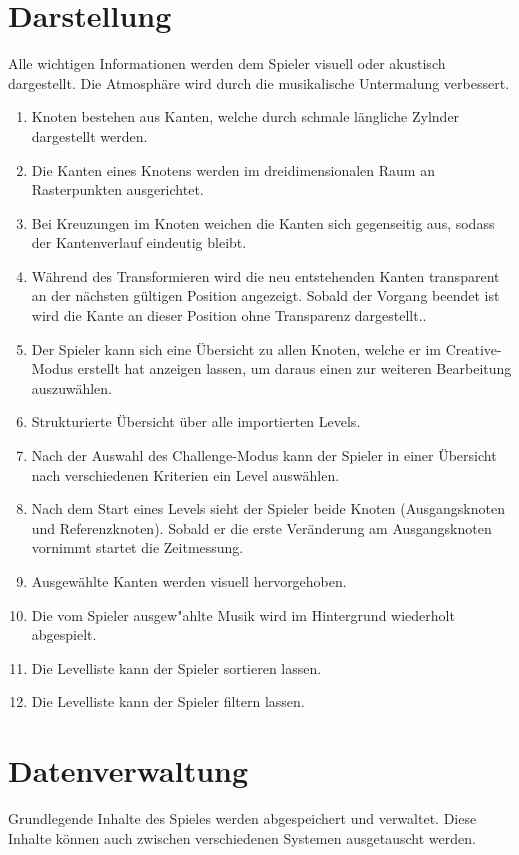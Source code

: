 \section{Darstellung}
Alle wichtigen Informationen werden dem Spieler visuell oder akustisch dargestellt. Die Atmosphäre wird durch die musikalische Untermalung verbessert.

\begin{enumerate}[resume]
\item Knoten bestehen aus Kanten, welche durch schmale längliche Zylnder dargestellt werden.
\item Die Kanten eines Knotens werden im dreidimensionalen Raum an Rasterpunkten ausgerichtet.
\item Bei Kreuzungen im Knoten weichen die Kanten sich gegenseitig aus, sodass der Kantenverlauf eindeutig bleibt.
\item Während des Transformieren wird die neu entstehenden Kanten transparent an der nächsten gültigen Position angezeigt. Sobald der Vorgang beendet ist wird die Kante an dieser Position ohne Transparenz dargestellt..
\item Der Spieler kann sich eine Übersicht zu allen Knoten, welche er im Creative-Modus erstellt hat anzeigen lassen, um daraus einen zur weiteren Bearbeitung auszuwählen.
\item Strukturierte Übersicht über alle importierten Levels. %
\item Nach der Auswahl des Challenge-Modus kann der Spieler in einer Übersicht nach verschiedenen Kriterien ein Level auswählen.
\item Nach dem Start eines Levels sieht der Spieler beide Knoten (Ausgangsknoten und Referenzknoten). Sobald er die erste Veränderung am Ausgangsknoten vornimmt startet die Zeitmessung.
\item Ausgewählte Kanten werden visuell hervorgehoben.
\item Die vom Spieler ausgew{"a}hlte Musik wird im Hintergrund wiederholt abgespielt. %
\item Die Levelliste kann der Spieler sortieren lassen. %
\item Die Levelliste kann der Spieler filtern lassen. %

\end{enumerate}
\section{Datenverwaltung}
Grundlegende Inhalte des Spieles werden abgespeichert und verwaltet.
Diese Inhalte können auch zwischen verschiedenen Systemen ausgetauscht werden. 


